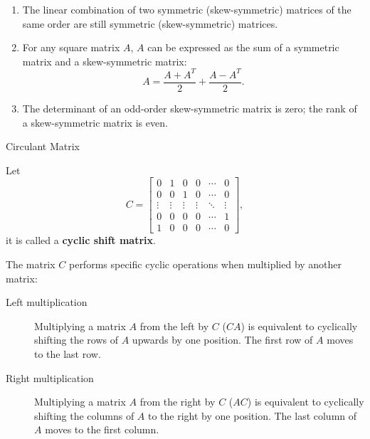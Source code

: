 \documentclass[11pt]{../../TexTemplate/elegantbook} %
\begin{document}
\begin{property}
    \begin{enumerate}
        \item The linear combination of two symmetric (skew-symmetric) matrices of the same order 
            are still symmetric (skew-symmetric) matrices. 
        \item For any square matrix \(A\), \(A\) can be expressed as the sum of 
            a symmetric matrix and a skew-symmetric matrix:
            \[
            A = \frac{A + A^T}{2} + \frac{A - A^T}{2}.
            \]
        \item The determinant of an odd-order skew-symmetric matrix is zero; 
            the rank of a skew-symmetric matrix is even. 
    \end{enumerate}
\end{property}


\begin{leftbarTitle}{Circulant Matrix}\end{leftbarTitle}
Let 
\[
C = 
\begin{bmatrix} 
    0 & 1 & 0 & 0 & \cdots & 0 \\ 
    0 & 0 & 1 & 0 & \cdots & 0 \\ 
    \vdots & \vdots & \vdots & \vdots & \ddots & \vdots \\ 
    0 & 0 & 0 & 0 & \cdots & 1 \\
    1 & 0 & 0 & 0 & \cdots & 0
\end{bmatrix},
\]
it is called a \textbf{cyclic shift matrix}.

The matrix \(C\) performs specific cyclic operations when multiplied by another matrix:
\begin{description}
    \item [Left multiplication] Multiplying a matrix \(A\) from the left by \(C\) (\(CA\)) 
        is equivalent to cyclically shifting the rows of \(A\) upwards by one position. 
        The first row of \(A\) moves to the last row.
    \item [Right multiplication] Multiplying a matrix \(A\) from the right by \(C\) (\(AC\)) 
        is equivalent to cyclically shifting the columns of \(A\) to the right by one position. 
        The last column of \(A\) moves to the first column.
\end{description}
\end{document}
